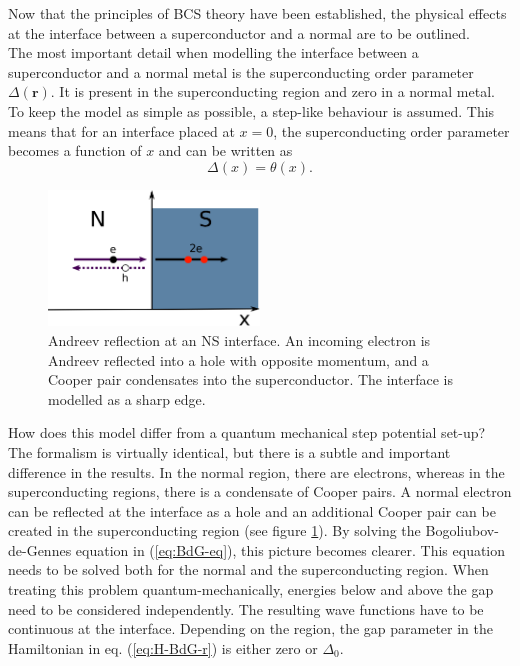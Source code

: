 Now that the principles of BCS theory have been established, the physical effects at the interface between a superconductor and a normal are to be outlined.\\
The most important detail when modelling the interface between a superconductor and a normal metal is the superconducting order parameter $\Delta \left( \mathbf{r} \right)$. It is present in the superconducting region and zero in a normal metal. To keep the model as simple as possible, a step-like behaviour is assumed. This means that for an interface placed at $x=0$, the superconducting order parameter becomes a function of $x$ and can be written as
\begin{equation}
\Delta \left( x \right) = \theta \left(x \right).\label{eq:delta }
\end{equation}
\begin{figure}
\centering
\includegraphics[width=0.5\textwidth]{figure/framework-analytical/ns-interface}
\caption{Andreev reflection at an NS interface. An incoming electron is Andreev reflected into a hole with opposite momentum, and a Cooper pair condensates into the superconductor. The interface is modelled as a sharp edge.}\label{fig:ns-interface}
\end{figure}
How does this model differ from a quantum mechanical step potential set-up? The formalism is virtually identical, but there is a subtle and important difference in the results. In the normal region, there are electrons, whereas in the superconducting regions, there is a condensate of Cooper pairs. A normal electron can be reflected at the interface as a hole and an additional Cooper pair can be created in the superconducting region (see figure \ref{fig:ns-interface}). By solving the Bogoliubov-de-Gennes equation in (\ref{eq:BdG-eq}), this picture becomes clearer.  This equation needs to be solved both for the normal and the superconducting region. When treating this problem quantum-mechanically, energies below and above the gap need to be considered independently. The resulting wave functions have to be continuous at the interface. Depending on the region, the gap parameter in the Hamiltonian in eq. (\ref{eq:H-BdG-r}) is either zero or $\Delta_0$.

